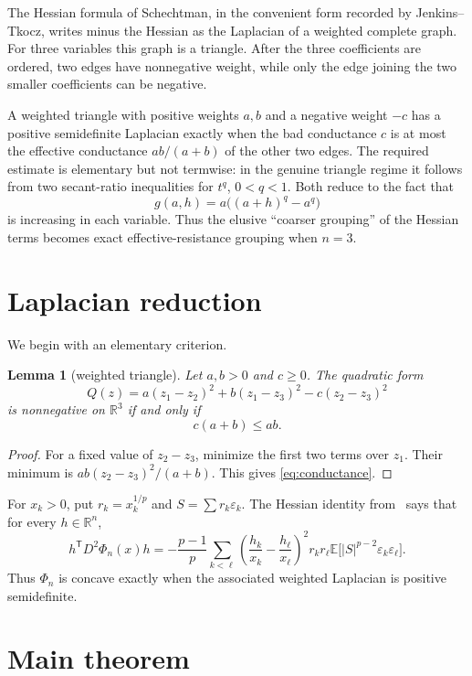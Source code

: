 \documentclass[11pt]{article}
\newtheorem{lemma}{Lemma}
\newcommand{\E}{\mathbb E}
\newcommand{\R}{\mathbb R}
\newcommand{\eps}{\varepsilon}
\begin{document}
The Hessian formula of Schechtman, in the convenient form recorded by
Jenkins--Tkocz, writes minus the Hessian as the Laplacian of a weighted
complete graph.  For three variables this graph is a triangle.  After the
three coefficients are ordered, two edges have nonnegative weight, while
only the edge joining the two smaller coefficients can be negative.

A weighted triangle with positive weights $a,b$ and a negative weight $-c$
has a positive semidefinite Laplacian exactly when the bad conductance $c$ is
at most the effective conductance $ab/(a+b)$ of the other two edges.  The
required estimate is elementary but not termwise: in the genuine triangle
regime it follows from two secant-ratio inequalities for $t^q$, $0<q<1$.
Both reduce to the fact that
\[
 g(a,h)=a\big((a+h)^q-a^q\big)
\]
is increasing in each variable.  Thus the elusive ``coarser grouping'' of
the Hessian terms becomes exact effective-resistance grouping when $n=3$.

\section{Laplacian reduction}

We begin with an elementary criterion.

\begin{lemma}[weighted triangle]\label{lem:triangle}
Let $a,b>0$ and $c\geq0$.  The quadratic form
\[
 Q(z)=a(z_1-z_2)^2+b(z_1-z_3)^2-c(z_2-z_3)^2
\]
is nonnegative on $\R^3$ if and only if
\[
 c(a+b)\leq ab.
\tag{3}\label{eq:conductance}
\]
\end{lemma}

\begin{proof}
For a fixed value of $z_2-z_3$, minimize the first two terms over $z_1$.
Their minimum is $ab(z_2-z_3)^2/(a+b)$.  This gives
\eqref{eq:conductance}.
\end{proof}

For $x_k>0$, put $r_k=x_k^{1/p}$ and $S=\sum r_k\eps_k$.  The Hessian
identity from~\cite[Lemma 3]{jenkins} says that for every $h\in\R^n$,
\[
 h^{\mathsf T}D^2\Phi_n(x)h
 =-\frac{p-1}{p}\sum_{k<\ell}
 \left(\frac{h_k}{x_k}-\frac{h_\ell}{x_\ell}\right)^2
 r_kr_\ell\E\big[|S|^{p-2}\eps_k\eps_\ell\big].
\tag{4}\label{eq:hessian}
\]
Thus $\Phi_n$ is concave exactly when the associated weighted Laplacian is
positive semidefinite.

\section{Main theorem}
\end{document}
